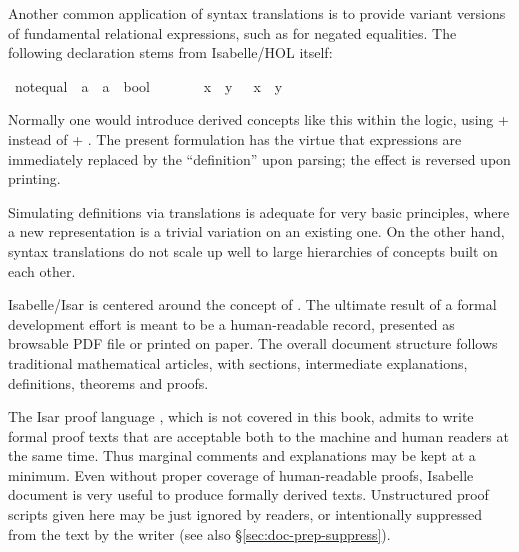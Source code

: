 \begin{isabellebody}
\begin{isamarkuptext}
  \medskip Another common application of syntax translations is to
  provide variant versions of fundamental relational expressions, such
  as \isa{{\isasymnoteq}} for negated equalities.  The following declaration
  stems from Isabelle/HOL itself:%
\end{isamarkuptext}%
\isamarkuptrue%
\ {\isachardoublequote}{\isacharunderscore}not{\isacharunderscore}equal{\isachardoublequote}\ {\isacharcolon}{\isacharcolon}\ {\isachardoublequote}{\isacharprime}a\ {\isasymRightarrow}\ {\isacharprime}a\ {\isasymRightarrow}\ bool{\isachardoublequote}\ \ \ \ {\isacharparenleft}\ {\isachardoublequote}{\isasymnoteq}{\isasymignore}{\isachardoublequote}\ {}{}{\isacharparenright}\isanewline
\isamarkupfalse%
\ {\isachardoublequote}x\ {\isasymnoteq}{\isasymignore}\ y{\isachardoublequote}\ {\isasymrightleftharpoons}\ {\isachardoublequote}{\isasymnot}\ {\isacharparenleft}x\ {\isacharequal}\ y{\isacharparenright}{\isachardoublequote}\isamarkupfalse%
%
\begin{isamarkuptext}%
\noindent Normally one would introduce derived concepts like this
  within the logic, using  + 
  instead of  + .  The
  present formulation has the virtue that expressions are immediately
  replaced by the ``definition'' upon parsing; the effect is reversed
  upon printing.

  Simulating definitions via translations is adequate for very basic
  principles, where a new representation is a trivial variation on an
  existing one.  On the other hand, syntax translations do not scale
  up well to large hierarchies of concepts built on each other.%
\end{isamarkuptext}%
\isamarkuptrue%
%
\isamarkuptrue%
%
\begin{isamarkuptext}%
Isabelle/Isar is centered around the concept of .  The ultimate result of a
  formal development effort is meant to be a human-readable record,
  presented as browsable PDF file or printed on paper.  The overall
  document structure follows traditional mathematical articles, with
  sections, intermediate explanations, definitions, theorems and
  proofs.

  The Isar proof language \cite{Wenzel-PhD}, which is not covered in
  this book, admits to write formal proof texts that are acceptable
  both to the machine and human readers at the same time.  Thus
  marginal comments and explanations may be kept at a minimum.  Even
  without proper coverage of human-readable proofs, Isabelle document
  is very useful to produce formally derived texts.  Unstructured
  proof scripts given here may be just ignored by readers, or
  intentionally suppressed from the text by the writer (see also
  \S\ref{sec:doc-prep-suppress}).


\end{isamarkuptext}
\end{isabellebody}
